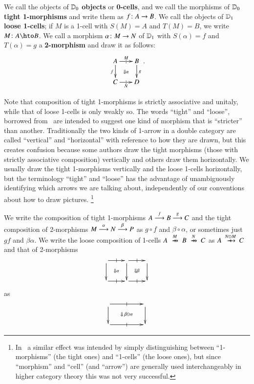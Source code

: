 We call the objects of $\lD_0$ \textbf{objects} or \textbf{0-cells},
and we call the morphisms of $\lD_0$ \textbf{tight 1-morphisms}
and write them as $f\maps A\to B$.  We call the objects of $\lD_1$
\textbf{loose 1-cells}; if $M$ is a 1-cell with $S(M)=A$ and
$T(M)=B$, we write $M\maps A\hto B$.  We call a morphism $\alpha\maps
M\to N$ of $\lD_1$ with $S(\alpha)=f$ and $T(\alpha)=g$ a
\textbf{2-morphism} and draw it as follows:
\begin{equation}\label{eq:square}
  \xymatrix@-.5pc{
    A \ar[r]|{|}^{M}  \ar[d]_f \ar@{}[dr]|{\Downarrow\alpha}&
    B\ar[d]^g\\
    C \ar[r]|{|}_N & D
  }.
\end{equation}


Note that composition of tight 1-morphisms is strictly associative and unitaly, while that of loose 1-cells is only weakly so.
The words ``tight'' and ``loose'', borrowed from~\cite{ls:limlax} are intended to suggest one kind of morphism that is ``stricter'' than another.
Traditionally the two kinds of 1-arrow in a double category are called ``vertical'' and ``horizontal'' with reference to how they are drawn, but this creates confusion because some authors draw the tight morphisms (those with strictly associative composition) vertically and others draw them horizontally.
We usually draw the tight 1-morphisms vertically and the loose 1-cells horizontally, but the terminology ``tight'' and ``loose'' has the advantage of unambiguously identifying which arrows we are talking about, independently of our conventions about how to draw pictures.%
\footnote{In~\cite{shulman:smbicat} a similar effect was intended by simply distinguishing between ``1-morphisms'' (the tight ones) and ``1-cells'' (the loose ones), but since ``morphism'' and ``cell'' (and ``arrow'') are generally used interchangeably in higher category theory this was not very successful.}

We write the composition of tight 1-morphisms $A\too[f] B\too[g] C$
and the tight composition of 2-morphisms $M\too[\alpha]
N\too[\beta] P$ as $g\circ f$ and $\beta\circ\alpha$, or sometimes
just $gf$ and $\beta\alpha$.  We write the loose composition of
1-cells $A\xhto{M} B \xhto{N} C$ as $A\xhto{N\odot M} C$ and that of
2-morphisms
\[\vcenter{\xymatrix{ \ar[r]|-@{|}^-{} \ar[d] \ar@{}[dr]|{\Downarrow\alpha} &
     \ar[r]|-@{|}^-{} \ar[d] \ar@{}[dr]|{\Downarrow\beta} &\ar[d]\\
  \ar[r]|-@{|}_-{} & \ar[r]|-@{|}_-{} & }}\]
as
\[\vcenter{\xymatrix@C=4pc{ \ar[r]|-@{|}^-{} \ar[d] \ar@{}[dr]|{\Downarrow\;\be\odot\al} &  \ar[d]\\
  \ar[r]|-@{|}_-{} & }}\]


